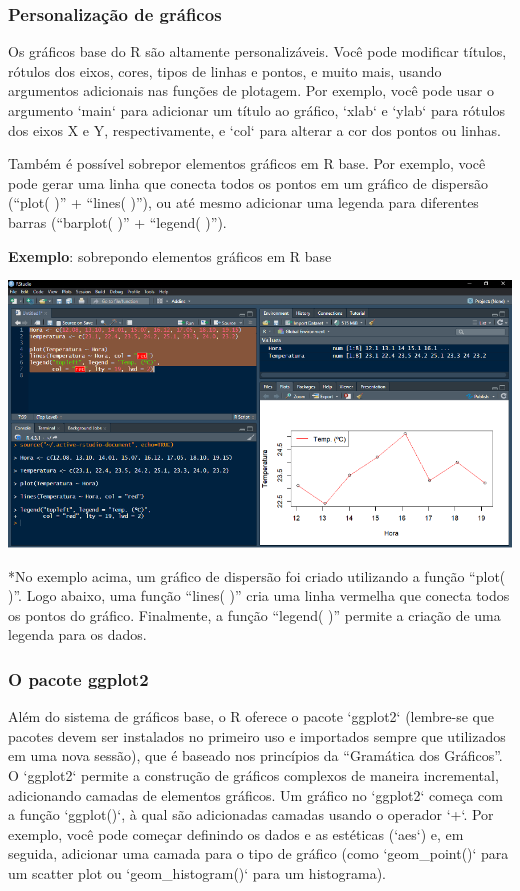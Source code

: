 \documentclass[
]{book}
\begin{document}
\subsubsection{Personalização de gráficos}\label{personalizauxe7uxe3o-de-gruxe1ficos}

Os gráficos base do R são altamente personalizáveis. Você pode modificar títulos, rótulos dos eixos, cores, tipos de linhas e pontos, e muito mais, usando argumentos adicionais nas funções de plotagem. Por exemplo, você pode usar o argumento `main` para adicionar um título ao gráfico, `xlab` e `ylab` para rótulos dos eixos X e Y, respectivamente, e `col` para alterar a cor dos pontos ou linhas.

Também é possível sobrepor elementos gráficos em R base. Por exemplo, você pode gerar uma linha que conecta todos os pontos em um gráfico de dispersão (``plot( )'' + ``lines( )''), ou até mesmo adicionar uma legenda para diferentes barras (``barplot( )'' + ``legend( )'').

\textbf{Exemplo}: sobrepondo elementos gráficos em R base

\includegraphics{images/clipboard-2859898208.png}

*No exemplo acima, um gráfico de dispersão foi criado utilizando a função ``plot( )''. Logo abaixo, uma função ``lines( )'' cria uma linha vermelha que conecta todos os pontos do gráfico. Finalmente, a função ``legend( )'' permite a criação de uma legenda para os dados.

\subsubsection{O pacote ggplot2}\label{o-pacote-ggplot2}

Além do sistema de gráficos base, o R oferece o pacote `ggplot2` (lembre-se que pacotes devem ser instalados no primeiro uso e importados sempre que utilizados em uma nova sessão), que é baseado nos princípios da ``Gramática dos Gráficos''. O `ggplot2` permite a construção de gráficos complexos de maneira incremental, adicionando camadas de elementos gráficos. Um gráfico no `ggplot2` começa com a função `ggplot()`, à qual são adicionadas camadas usando o operador `+`. Por exemplo, você pode começar definindo os dados e as estéticas (`aes`) e, em seguida, adicionar uma camada para o tipo de gráfico (como `geom\_point()` para um scatter plot ou `geom\_histogram()` para um histograma).
\end{document}
